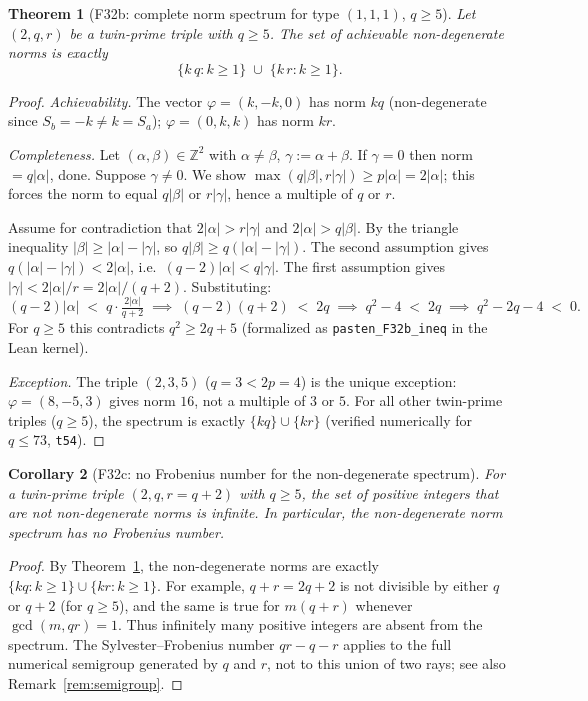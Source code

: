 \documentclass[12pt]{article}
\newtheorem{theorem}{Theorem}
\newtheorem{corollary}[theorem]{Corollary}
\theoremstyle{definition}
\begin{document}
\begin{theorem}[F32b: complete norm spectrum for type $(1,1,1)$, $q \ge 5$]\label{thm:f32b}
  Let $(2, q, r)$ be a twin-prime triple with $q \ge 5$.
  The set of achievable non-degenerate norms is exactly
  \[
    \{ k\,q : k \ge 1 \} \;\cup\; \{ k\,r : k \ge 1 \}.
  \]
\end{theorem}

\begin{proof}
  \textit{Achievability.}  The vector $\varphi = (k,-k,0)$ has norm $kq$
  (non-degenerate since $S_b=-k\ne k=S_a$); $\varphi=(0,k,k)$ has norm $kr$.

  \textit{Completeness.}  Let $(\alpha,\beta)\in\mathbb{Z}^2$ with $\alpha\ne\beta$,
  $\gamma:=\alpha+\beta$.  If $\gamma=0$ then norm $=q|\alpha|$, done.
  Suppose $\gamma\ne 0$.  We show $\max(q|\beta|, r|\gamma|) \ge p|\alpha| = 2|\alpha|$;
  this forces the norm to equal $q|\beta|$ or $r|\gamma|$, hence a multiple of $q$ or $r$.

  Assume for contradiction that $2|\alpha| > r|\gamma|$ and $2|\alpha| > q|\beta|$.
  By the triangle inequality $|\beta| \ge |\alpha|-|\gamma|$, so
  $q|\beta| \ge q(|\alpha|-|\gamma|)$.  The second assumption gives
  $q(|\alpha|-|\gamma|) < 2|\alpha|$, i.e.\ $(q-2)|\alpha| < q|\gamma|$.
  The first assumption gives $|\gamma| < 2|\alpha|/r = 2|\alpha|/(q+2)$.
  Substituting:
  \[
    (q-2)|\alpha| \;<\; q \cdot \tfrac{2|\alpha|}{q+2}
    \;\implies\;
    (q-2)(q+2) \;<\; 2q
    \;\implies\;
    q^2 - 4 \;<\; 2q
    \;\implies\;
    q^2 - 2q - 4 \;<\; 0.
  \]
  For $q \ge 5$ this contradicts $q^2 \ge 2q+5$
  (formalized as \texttt{pasten\_F32b\_ineq} in the Lean kernel).

  \textit{Exception.}  The triple $(2,3,5)$ ($q=3 < 2p=4$) is the unique exception:
  $\varphi=(8,-5,3)$ gives norm $16$, not a multiple of $3$ or $5$.
  For all other twin-prime triples ($q \ge 5$), the spectrum is exactly
  $\{kq\}\cup\{kr\}$ (verified numerically for $q\le 73$, \texttt{t54}).
\end{proof}

\begin{corollary}[F32c: no Frobenius number for the non-degenerate spectrum]\label{cor:f32c}
  For a twin-prime triple $(2,q,r=q+2)$ with $q \ge 5$, the set of positive
  integers that are \emph{not} non-degenerate norms is infinite.  In particular,
  the non-degenerate norm spectrum has no Frobenius number.
\end{corollary}

\begin{proof}
  By Theorem~\ref{thm:f32b}, the non-degenerate norms are exactly
  $\{kq:k\ge1\}\cup\{kr:k\ge1\}$.  For example, $q+r=2q+2$ is not divisible by
  either $q$ or $q+2$ (for $q\ge5$), and the same is true for
  $m(q+r)$ whenever $\gcd(m,qr)=1$.  Thus infinitely many positive integers
  are absent from the spectrum.  The Sylvester--Frobenius number
  $qr-q-r$ applies to the full numerical semigroup generated by $q$ and $r$,
  not to this union of two rays; see also Remark~\ref{rem:semigroup}.
\end{proof}
\end{document}
